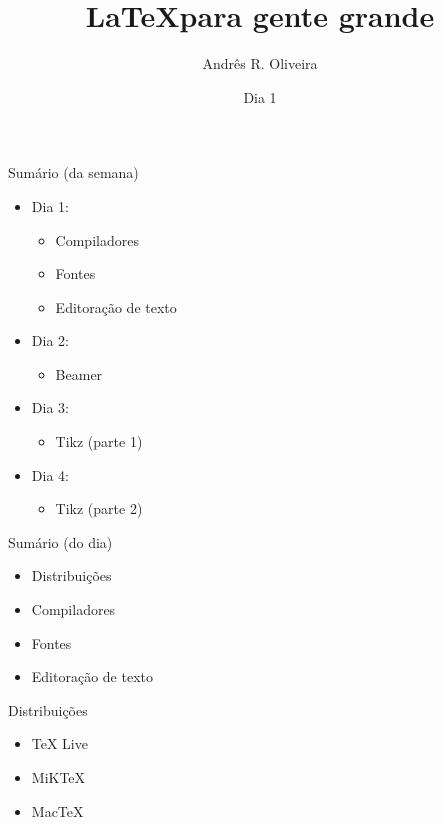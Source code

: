 \documentclass[handout]{beamer}
\title{\LaTeX para gente grande}
\author[Andrês]{Andrês R. Oliveira}
\date{Dia 1}
\begin{document}
\begin{frame}
    \maketitle
\end{frame}

\begin{frame}{Sumário (da semana)}
    \begin{itemize}
        \item Dia 1:
            \begin{itemize}
                \item Compiladores
                \item Fontes 
                \item Editoração de texto
            \end{itemize}

        \item Dia 2:
            \begin{itemize}
                \item Beamer
            \end{itemize}

        \item Dia 3:
            \begin{itemize}
                \item Tikz (parte 1)
            \end{itemize}

        \item Dia 4:
            \begin{itemize}
                \item Tikz (parte 2)
            \end{itemize}
    \end{itemize}
\end{frame}

\begin{frame}{Sumário (do dia)}
    \begin{itemize}
        \item Distribuições
        \item Compiladores
        \item Fontes
        \item Editoração de texto
    \end{itemize}
\end{frame}

\begin{frame}{Distribuições}
    \begin{itemize}
        \item TeX Live
        \item MiKTeX
        \item MacTeX
    \end{itemize}
\end{frame}
\end{document}
